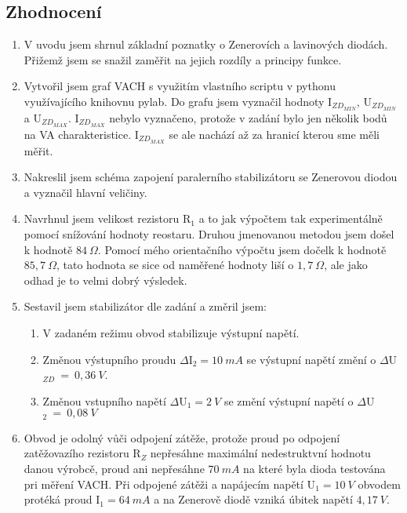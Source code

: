   \subsection{Zhodnocení}
    \begin{enumerate}
      \item
        V uvodu jsem shrnul základní poznatky o Zenerovích a lavinových diodách. Přižemž jsem se snažil zaměřit na jejich rozdíly a principy funkce.
      \item
        Vytvořil jsem graf VACH s využitím vlastního scriptu v pythonu využívajícího knihovnu pylab. Do grafu jsem vyznačil hodnoty I$_{ZD_{MIN}}$, U$_{ZD_{MIN}}$ a U$_{ZD_{MAX}}$. I$_{ZD_{MAX}}$ nebylo vyznačeno, protože v zadání bylo jen několik bodů na VA charakteristice. I$_{ZD_{MAX}}$ se ale nachází až za hranicí kterou sme měli měřit.
      \item
        Nakreslil jsem schéma zapojení paralerního stabilizátoru se Zenerovou diodou a vyznačil hlavní veličiny.
      \item
        Navrhnul jsem velikost rezistoru R$_1$ a to jak výpočtem tak experimentálně pomocí snížování hodnoty reostaru. Druhou jmenovanou metodou jsem došel k hodnotě $84~\Omega$. Pomocí mého orientačního výpočtu jsem dočelk k hodnotě $85,7~\Omega$, tato hodnota se sice od naměřené hodnoty liší o $1,7~\Omega$, ale jako odhad je to velmi dobrý výsledek.
      \item
        Sestavil jsem stabilizátor dle zadání a změril jsem:
        \begin{enumerate}
          \item
            V zadaném režimu obvod stabilizuje výstupní napětí.    
          \item            
            Změnou výstupního proudu $\Delta$I$_2 = 10~mA$ se výstupní napětí změní o $\Delta$U$_{ZD}~=~0,36~V$.
          \item
            Změnou vstupního napětí $\Delta$U$_1 = 2~V$ se změní výstupní napětí o $\Delta$U$_2~=~0,08~V$
        \end{enumerate}
      \item
        Obvod je odolný vůči odpojení zátěže, protože proud po odpojení zatěžovazího rezistoru R$_Z$ nepřesáhne maximální nedestruktvní hodnotu danou výrobcě, proud ani nepřesáhne $70~mA$ na které byla dioda testována pri měření VACH. Při odpojené zátěži a napájecím napětí U$_1 = 10~V$ obvodem protéká proud I$_1 = 64~mA$ a na Zenerově diodě vzniká úbitek napětí $4,17~V$.
      
    \end{enumerate}

